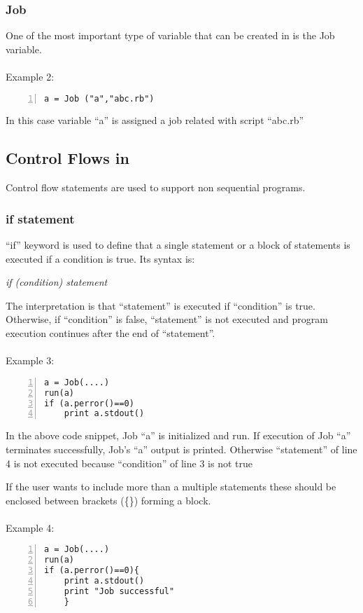 \subsubsection*{Job}
One of the most important type of variable that can be created in \lang{} is the Job variable.\\
\\
Example 2:
\begin{Verbatim}[numbers=left]
a = Job ("a","abc.rb")
\end{Verbatim}
In this case variable ``a'' is assigned a job related with script ``abc.rb'' 

\subsection*{Control Flows in \lang{}}
Control flow statements are used to support non sequential \lang{} programs.
\subsubsection*{if statement}
``if'' keyword is used to define that a single statement or a block of statements is executed if a condition is true. Its syntax is: 

\textit{if (condition) statement}

\noindent The interpretation is that ``statement'' is executed if ``condition'' is true. 
Otherwise, if ``condition'' is false, ``statement'' is not executed and program execution continues after the end of ``statement''.
\\
\\
Example 3:
\begin{Verbatim}[numbers=left]
a = Job(....)
run(a)
if (a.perror()==0)
    print a.stdout()
\end{Verbatim}

In the above code snippet, Job ``a'' is initialized and run. If execution of Job ``a'' terminates successfully, Job's ``a'' output is printed. 
Otherwise ``statement'' of line 4 is not executed because ``condition'' of line 3 is not true

If the user wants to include more than a multiple statements these should be enclosed between brackets (\{\}) forming a block.\\
\\
Example 4:
\begin{Verbatim}[numbers=left]
a = Job(....)
run(a)
if (a.perror()==0){
    print a.stdout()
    print "Job successful"
    }
\end{Verbatim}
